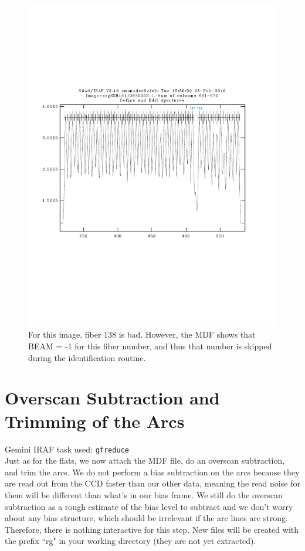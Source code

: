 \documentclass[12pt]{report}
\begin{document}
\begin{figure}[h]
\centering
\includegraphics[scale=0.6]{badfiber_num}
\caption[Example Image of a Bad Fiber]{For this image, fiber 138 is bad. However, the MDF shows that BEAM = -1 for this fiber number, and thus that number is skipped during the identification routine.}
\label{fig:bad}
\end{figure}

\bigskip
\section{Overscan Subtraction and Trimming of the Arcs}

\noindent Gemini IRAF task used: \texttt{gfreduce} \\

\noindent Just as for the flats, we now attach the MDF file, do an overscan subtraction, and trim the arcs. We do not perform a bias subtraction on the arcs because they are read out from the CCD faster than our other data, meaning the read noise for them will be different than what's in our bias frame. We still do the overscan subtraction as a rough estimate of the bias level to subtract and we don't worry about any bias structure, which should be irrelevant if the arc lines are strong. Therefore, there is nothing interactive for this step. New files will be created with the prefix ``rg" in your working directory (they are not yet extracted). \\
\end{document}
